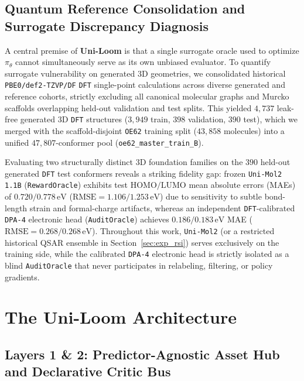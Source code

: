 \documentclass[11pt,a4paper]{article}
\begin{document}
\subsection{Quantum Reference Consolidation and Surrogate Discrepancy Diagnosis}
\label{sec:quantum_audit}
A central premise of \textbf{Uni-Loom} is that a single surrogate oracle used to optimize $\pi_\theta$ cannot simultaneously serve as its own unbiased evaluator. To quantify surrogate vulnerability on generated 3D geometries, we consolidated historical \texttt{PBE0/def2-TZVP/DF} \texttt{DFT} single-point calculations \citep{sun2020pyscf,li2024gpu4pyscf,stuke2020oe62} across diverse generated and reference cohorts, strictly excluding all canonical molecular graphs and Murcko scaffolds overlapping held-out validation and test splits. This yielded $4{,}737$ leak-free generated 3D \texttt{DFT} structures ($3{,}949$ train, $398$ validation, $390$ test), which we merged with the scaffold-disjoint \texttt{OE62} training split ($43{,}858$ molecules) into a unified $47{,}807$-conformer pool (\texttt{oe62\_master\_train\_B}).

Evaluating two structurally distinct 3D foundation families on the $390$ held-out generated \texttt{DFT} test conformers reveals a striking fidelity gap: frozen \texttt{Uni-Mol2 1.1B} \citep{ji2024unimol2} (\texttt{RewardOracle}) exhibits test $\text{HOMO}/\text{LUMO}$ mean absolute errors (MAEs) of $0.720 / 0.778\,\text{eV}$ ($\text{RMSE} = 1.106 / 1.253\,\text{eV}$) due to sensitivity to subtle bond-length strain and formal-charge artifacts, whereas an independent \texttt{DFT}-calibrated \texttt{DPA-4} electronic head \citep{deepmodeling2026dpa4} (\texttt{AuditOracle}) achieves $0.186 / 0.183\,\text{eV}$ MAE ($\text{RMSE} = 0.268 / 0.268\,\text{eV}$). Throughout this work, \texttt{Uni-Mol2} (or a restricted historical QSAR ensemble in Section~\ref{sec:exp_rsi}) serves exclusively on the training side, while the calibrated \texttt{DPA-4} electronic head is strictly isolated as a blind \texttt{AuditOracle} that never participates in relabeling, filtering, or policy gradients.

\section{The Uni-Loom Architecture}
\label{sec:method}

\subsection{Layers 1 \& 2: Predictor-Agnostic Asset Hub and Declarative Critic Bus}
\label{sec:asset_bus}
\end{document}

